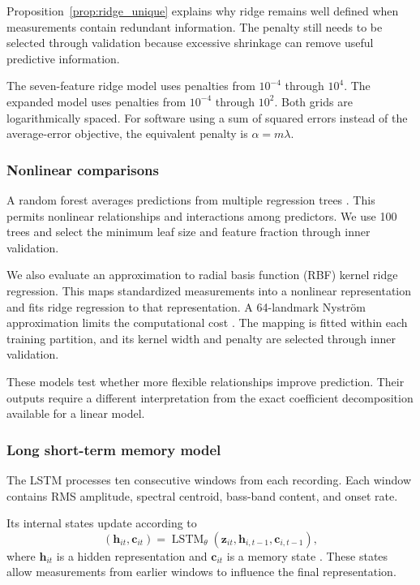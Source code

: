 Proposition~\ref{prop:ridge_unique} explains why ridge remains well defined when measurements contain redundant information. The penalty still needs to be selected through validation because excessive shrinkage can remove useful predictive information.

The seven-feature ridge model uses penalties from $10^{-4}$ through $10^4$. The expanded model uses penalties from $10^{-4}$ through $10^2$. Both grids are logarithmically spaced. For software using a sum of squared errors instead of the average-error objective, the equivalent penalty is $\alpha=m\lambda$.

\subsubsection{Nonlinear comparisons}

A random forest averages predictions from multiple regression trees \cite{sklearnforest}. This permits nonlinear relationships and interactions among predictors. We use 100 trees and select the minimum leaf size and feature fraction through inner validation.

We also evaluate an approximation to radial basis function (RBF) kernel ridge regression. This maps standardized measurements into a nonlinear representation and fits ridge regression to that representation. A 64-landmark Nystr\"om approximation limits the computational cost \cite{sklearnnystroem}. The mapping is fitted within each training partition, and its kernel width and penalty are selected through inner validation.

These models test whether more flexible relationships improve prediction. Their outputs require a different interpretation from the exact coefficient decomposition available for a linear model.

\subsubsection{Long short-term memory model}

The LSTM processes ten consecutive windows from each recording. Each window contains RMS amplitude, spectral centroid, bass-band content, and onset rate.

Its internal states update according to
\begin{equation}
(\mathbf h_{it},\mathbf c_{it})
=
\operatorname{LSTM}_{\theta}
(\mathbf z_{it},\mathbf h_{i,t-1},\mathbf c_{i,t-1}),
\end{equation}
where $\mathbf h_{it}$ is a hidden representation and $\mathbf c_{it}$ is a memory state \cite{hochreiter1997lstm}. These states allow measurements from earlier windows to influence the final representation.

